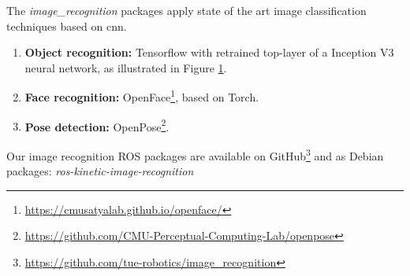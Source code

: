 The \emph{image\_recognition} packages apply state of the art image classification techniques based on \acrfull{cnn}.
\begin{enumerate}
\begin{figure}[H]
    \centering
    \vspace{-1em}
	\texttt{[image: Figures/cnn]}
    \caption{Illustration of \acrfull{cnn} used in our object recognition nodes with use of Tensorflow.}
	\label{fig:cnn}
\end{figure}

\item \textbf{Object recognition:} Tensorflow\texttrademark\hspace{0em} with retrained top-layer of a Inception V3 neural network, as illustrated in Figure \ref{fig:cnn}.

\item \textbf{Face recognition:} OpenFace\footnote{\url{https://cmusatyalab.github.io/openface/}}, based on Torch.

\item \textbf{Pose detection:} OpenPose\footnote{\url{https://github.com/CMU-Perceptual-Computing-Lab/openpose}}.
\end{enumerate}
Our image recognition ROS packages are available on GitHub\footnote{\url{https://github.com/tue-robotics/image_recognition}} and as Debian packages: \emph{ros-kinetic-image-recognition}
